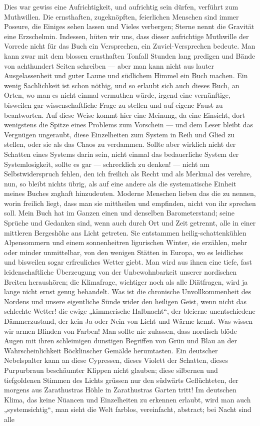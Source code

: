 Dies war gewiss eine Aufrichtigkeit, und aufrichtig sein dürfen, verführt zum Muthwillen. Die ernsthaften, zugeknöpften, feierlichen Menschen sind immer Poseure, die Einiges sehen lassen und Vieles verbergen; Sterne nennt die Gravität eine Erzschelmin. Indessen, hüten wir uns, dass dieser aufrichtige Muthwille der Vorrede nicht für das Buch ein Versprechen, ein Zuviel-Versprechen bedeute. Man kann zwar mit dem blossen ernsthaften Tonfall Stunden lang predigen und Bände von achthundert Seiten schreiben — aber man kann nicht aus lauter Ausgelassenheit und guter Laune und südlichem Himmel ein Buch machen. Ein wenig Sachlichkeit ist schon nöthig, und so erlaubt sich auch dieses Buch, an Orten, wo man es nicht einmal vermuthen würde, irgend eine vernünftige, bisweilen gar wissenschaftliche Frage zu stellen und auf eigene Faust zu beantworten. Auf diese Weise kommt hier eine Meinung, da eine Einsicht, dort wenigstens die Spitze eines Problems zum Vorschein — und dem Leser bleibt das Vergnügen ungeraubt, diese Einzelheiten zum System in Reih und Glied zu stellen, oder sie als das Chaos zu verdammen. Sollte aber wirklich nicht der Schatten eines Systems darin sein, nicht einmal das bedauerliche System der Systemlosigkeit, sollte es gar — schrecklich zu denken! — nicht am Selbstwiderspruch fehlen, den ich freilich als Recht und als Merkmal des  verehre, nun, so bleibt nichts übrig, als auf eine andere als die systematische Einheit meines Buches zaghaft hinzudeuten. Moderne Menschen lieben das die  zu nennen, worin freilich liegt, dass man sie mittheilen und empfinden, nicht von ihr sprechen soll. Mein Buch hat im Ganzen einen und denselben Barometerstand; seine Sprüche und Gedanken sind, wenn auch durch Ort und Zeit getrennt, alle in einer mittleren Bergeshöhe ans Licht getreten. Sie entstammen heilig-schattenkühlen Alpensommern und einem sonnenheitren ligurischen Winter, sie erzählen, mehr oder minder unmittelbar, von den wenigen Stätten in Europa, wo es leidliches und bisweilen sogar erfreuliches Wetter giebt. Man wird aus ihnen eine tiefe, fast leidenschaftliche Überzeugung von der Unbewohnbarkeit unserer nordischen Breiten heraushören; die Klimafrage, wichtiger noch als alle Diätfragen, wird ja lange nicht ernst genug behandelt. Was ist die chronische Unvollkommenheit des Nordens und unsere eigentliche Sünde wider den heiligen Geist, wenn nicht das schlechte Wetter! die ewige „kimmerische Halbnacht“, der bleierne unentschiedene Dämmerzustand, der kein Ja oder Nein von Licht und Wärme kennt. Was wissen wir armen Blinden von Farben! Man sollte nie zulassen, dass nordisch blöde Augen mit ihren schleimigen dunstigen Begriffen von Grün und Blau an der Wahrscheinlichkeit Böcklinscher Gemälde herumtasten. Ein deutscher Nebelspalter kann an diese Cypressen, dieses Violett der Schatten, dieses Purpurbraun beschäumter Klippen nicht glauben; diese silbernen und tiefgoldenen Stimmen des Lichts grüssen nur den südwärts Geflüchteten, der morgens aus Zarathustras Höhle in Zarathustras Garten tritt! Im deutschen Klima, das keine Nüancen und Einzelheiten zu erkennen erlaubt, wird man auch „systemsichtig“, man sieht die Welt farblos, vereinfacht, abstract; bei Nacht sind alle 